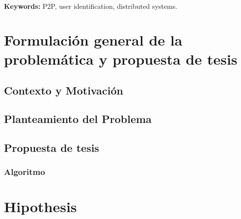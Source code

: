 \documentclass[12pt,spanish]{article}
\begin{document}
{\begin{minipage}[b]{0.9\textwidth}
{\bf Keywords:} P2P, user identification, distributed systems.

\end{minipage}
}

\vfill
\section{Formulación general de la problemática y propuesta de tesis}



\subsection{Contexto y Motivación}


\subsection{Planteamiento del Problema}


\subsection{Propuesta de tesis}


\subsubsection{Algoritmo}



\section{Hipothesis}
\end{document}
